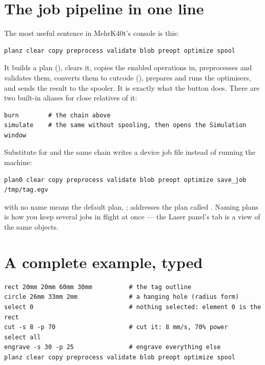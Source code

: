 \section{The job pipeline in one line}

The most useful sentence in MehrK40t's console is this:

\begin{lstlisting}[style=konsole]
planz clear copy preprocess validate blob preopt optimize spool
\end{lstlisting}

\noindent It builds a plan (), clears it, copies the enabled operations
in, preprocesses and validates them, converts them to cutcode (),
prepares and runs the optimisers, and sends the result to the spooler. It is
exactly what the  button does. There are two built-in aliases for
close relatives of it:

\begin{lstlisting}[style=konsole]
burn        # the chain above
simulate    # the same without spooling, then opens the Simulation window
\end{lstlisting}

\noindent Substitute  for  and the same chain
writes a device job file instead of running the machine:

\begin{lstlisting}[style=konsole]
plan0 clear copy preprocess validate blob preopt optimize save_job /tmp/tag.egv
\end{lstlisting}

\noindent {} with no name means the default plan, ; 
addresses the plan called . Naming plans is how you keep several jobs in
flight at once --- the Laser panel's  tab is a view of the same
objects.

\section{A complete example, typed}

\begin{lstlisting}[style=konsole]
rect 20mm 20mm 60mm 30mm          # the tag outline
circle 26mm 33mm 2mm              # a hanging hole (radius form)
select 0                          # nothing selected: element 0 is the rect
cut -s 8 -p 70                    # cut it: 8 mm/s, 70% power
select all
engrave -s 30 -p 25               # engrave everything else
planz clear copy preprocess validate blob preopt optimize spool
\end{lstlisting}


